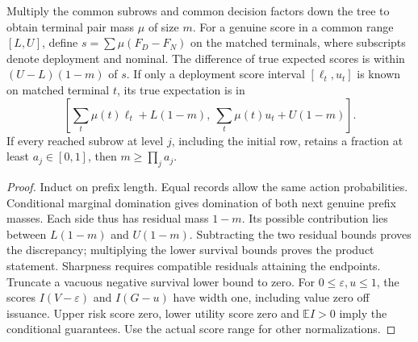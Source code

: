 \begin{theorem}\label{adv:g021}
Multiply the common subrows and common decision factors down the tree to obtain terminal pair mass \(\mu\) of size \(m\). For a genuine score in a common range \([L,U]\), define \(s=\sum\mu(F_D-F_N)\) on the matched terminals, where subscripts denote deployment and nominal. The difference of true expected scores is within \((U-L)(1-m)\) of \(s\). If only a deployment score interval \([\ell_t,u_t]\) is known on matched terminal \(t\), its true expectation is in
\[
 \left[\sum_t\mu(t)\ell_t+L(1-m),\
       \sum_t\mu(t)u_t+U(1-m)\right].
\]
If every reached subrow at level \(j\), including the initial row, retains a fraction at least \(a_j\in[0,1]\), then \(m\ge\prod_j a_j\).
\end{theorem}
\begin{proof}
Induct on prefix length. Equal records allow the same action probabilities. Conditional marginal domination gives domination of both next genuine prefix masses. Each side thus has residual mass \(1-m\). Its possible contribution lies between \(L(1-m)\) and \(U(1-m)\). Subtracting the two residual bounds proves the discrepancy; multiplying the lower survival bounds proves the product statement. Sharpness requires compatible residuals attaining the endpoints. Truncate a vacuous negative survival lower bound to zero. For \(0\le\varepsilon,u\le1\), the scores \(I(V-\varepsilon)\) and \(I(G-u)\) have width one, including value zero off issuance. Upper risk score zero, lower utility score zero and \(\mathbb EI>0\) imply the conditional guarantees. Use the actual score range for other normalizations.
\end{proof}

